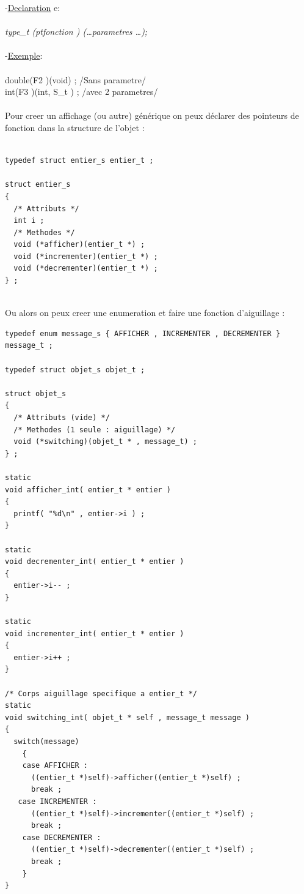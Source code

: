 \documentclass[a4paper,12pt,openany]{book}
\begin{document}
-\underline{Declaration} e: \\
\\
\emph{type\_t  (\∗ptfonction ) (\ldots parametres \ldots);}\\
\\
-\underline{Exemple}:\\
\\
double(\∗F2 )(void)  ;        /\*Sans parametre\*/\\
int(\∗F3 )(int, S\_t \∗)  ;    /\*avec 2 parametres\*/\\
\\
Pour creer un affichage (ou autre) générique on peux déclarer des pointeurs de fonction dans la structure de l'objet :\\
\\
\begin{verbatim}
typedef struct entier_s entier_t ;

struct entier_s
{
  /* Attributs */
  int i ; 
  /* Methodes */  
  void (*afficher)(entier_t *) ;
  void (*incrementer)(entier_t *) ;
  void (*decrementer)(entier_t *) ;
} ;
\end{verbatim}
\\
Ou alors on peux creer une enumeration et faire une fonction d'aiguillage : \\
\begin{verbatim}
typedef enum message_s { AFFICHER , INCREMENTER , DECREMENTER } message_t ;

typedef struct objet_s objet_t ;

struct objet_s
{
  /* Attributs (vide) */
  /* Methodes (1 seule : aiguillage) */
  void (*switching)(objet_t * , message_t) ;
} ;

static
void afficher_int( entier_t * entier ) 
{
  printf( "%d\n" , entier->i ) ; 
} 

static
void decrementer_int( entier_t * entier ) 
{
  entier->i-- ; 
} 

static
void incrementer_int( entier_t * entier ) 
{
  entier->i++ ; 
} 

/* Corps aiguillage specifique a entier_t */
static
void switching_int( objet_t * self , message_t message ) 
{
  switch(message)
    {
    case AFFICHER :
      ((entier_t *)self)->afficher((entier_t *)self) ;
      break ; 
   case INCREMENTER :
      ((entier_t *)self)->incrementer((entier_t *)self) ;
      break ; 
    case DECREMENTER :
      ((entier_t *)self)->decrementer((entier_t *)self) ;
      break ; 
    }
} 


\end{verbatim}
\end{document}
